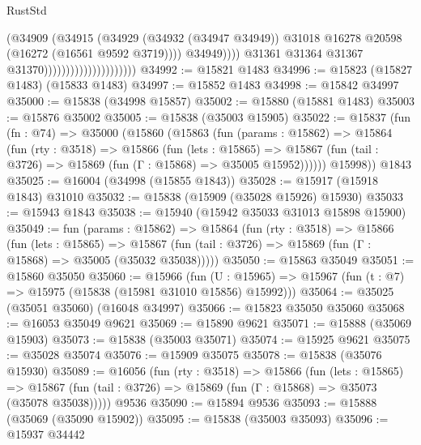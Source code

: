 \begin{lexlean}{RustStd}
\begin{coremodule}
                                                    (@34909
                                                      (@34915
                                                        (@34929
                                                          (@34932 (@34947 @34949))
                                                          @31018
                                                          @16278
                                                          @20598
                                                          (@16272 (@16561 @9592 @3719))))
                                                      @34949))))
                                              @31361
                                              @31364
                                              @31367
                                              @31370)))))))))))))))))))))
@34992 := @15821 @1483
@34996 := @15823 (@15827 @1483) (@15833 @1483)
@34997 := @15852 @1483
@34998 := @15842 @34997
@35000 := @15838 (@34998 @15857)
@35002 := @15880 (@15881 @1483)
@35003 := @15876 @35002
@35005 := @15838 (@35003 @15905)
@35022 := @15837
    (fun (fn : @74) =>
    @35000
      (@15860
        (@15863
          (fun (params : @15862) =>
          @15864
            (fun (rty : @3518) =>
            @15866
              (fun (lets : @15865) =>
              @15867 (fun (tail : @3726) => @15869 (fun (Γ : @15868) => @35005 @15952))))))
        @15998))
    @1843
@35025 := @16004 (@34998 (@15855 @1843))
@35028 := @15917 (@15918 @1843) @31010
@35032 := @15838 (@15909 (@35028 @15926) @15930)
@35033 := @15943 @1843
@35038 := @15940 (@15942 @35033 @31013 @15898 @15900)
@35049 := fun (params : @15862) =>
  @15864
    (fun (rty : @3518) =>
    @15866
      (fun (lets : @15865) =>
      @15867 (fun (tail : @3726) => @15869 (fun (Γ : @15868) => @35005 (@35032 @35038)))))
@35050 := @15863 @35049
@35051 := @15860 @35050
@35060 := @15966
    (fun (U : @15965) => @15967 (fun (t : @7) => @15975 (@15838 (@15981 @31010 @15856) @15992)))
@35064 := @35025 (@35051 @35060) (@16048 @34997)
@35066 := @15823 @35050 @35060
@35068 := @16053 @35049 @9621
@35069 := @15890 @9621
@35071 := @15888 (@35069 @15903)
@35073 := @15838 (@35003 @35071)
@35074 := @15925 @9621
@35075 := @35028 @35074
@35076 := @15909 @35075
@35078 := @15838 (@35076 @15930)
@35089 := @16056
    (fun (rty : @3518) =>
    @15866
      (fun (lets : @15865) =>
      @15867 (fun (tail : @3726) => @15869 (fun (Γ : @15868) => @35073 (@35078 @35038)))))
    @9536
@35090 := @15894 @9536
@35093 := @15888 (@35069 (@35090 @15902))
@35095 := @15838 (@35003 @35093)
@35096 := @15937 @34442

\end{coremodule}
\end{lexlean}
